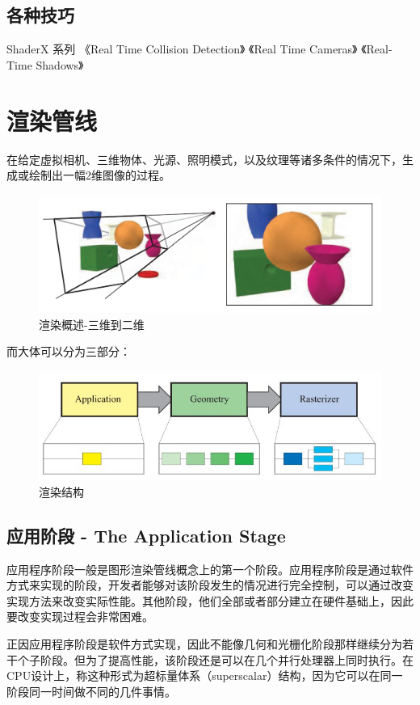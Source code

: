 \documentclass[UTF8,a4paper,12pt]{ctexbook}
\begin{document}
	\section{各种技巧}
		ShaderX 系列
		《Real Time Collision Detection》
		《Real Time Cameras》
		《Real-Time Shadows》
	
\chapter{渲染管线}
	在给定虚拟相机、三维物体、光源、照明模式，以及纹理等诸多条件的情况下，生成或绘制出一幅2维图像的过程。
		\begin{figure}[H]
			\centering
			\includegraphics[scale=0.5]{Outline}
			\caption{渲染概述-三维到二维}
		\end{figure}
		
		而大体可以分为三部分：
		
		\begin{figure}[H]
			\centering
			\includegraphics[scale=0.7]{Outline2}
			\caption{渲染结构}
		\end{figure}
		
	\section{应用阶段 - The Application Stage}
		应用程序阶段一般是图形渲染管线概念上的第一个阶段。应用程序阶段是通过软件方式来实现的阶段，开发者能够对该阶段发生的情况进行完全控制，可以通过改变实现方法来改变实际性能。其他阶段，他们全部或者部分建立在硬件基础上，因此要改变实现过程会非常困难。
		
		正因应用程序阶段是软件方式实现，因此不能像几何和光栅化阶段那样继续分为若干个子阶段。但为了提高性能，该阶段还是可以在几个并行处理器上同时执行。在CPU设计上，称这种形式为超标量体系（superscalar）结构，因为它可以在同一阶段同一时间做不同的几件事情。
		
\end{document}
